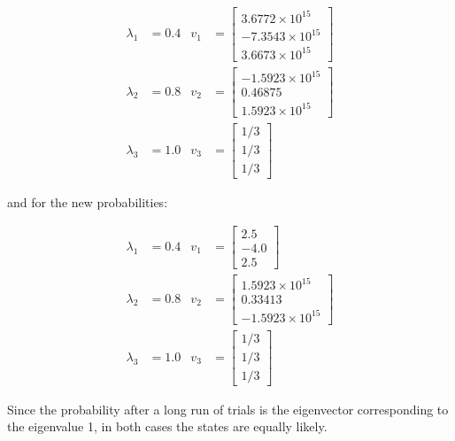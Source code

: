 \documentclass{article}
\begin{document}
\begin{align*}
\lambda_1 & = 0.4 & v_1 & = \left[ 
		\begin{matrix} 3.6772 \times 10^{15} \\ -7.3543 \times 10^{15} \\3.6673 \times 10^{15} 
	\end{matrix} \right] \\
\lambda_2 & = 0.8 & v_2 & = \left[
		\begin{matrix} -1.5923 \times 10^{15} \\ 0.46875 \\ 1.5923 \times 10^{15}
	\end{matrix} \right] \\
\lambda_3 & = 1.0 & v_3 & = \left[
		\begin{matrix} 1/3 \\ 1/3 \\ 1/3
	\end{matrix} \right]
\end{align*}

and for the new probabilities:

\begin{align*}
\lambda_1 & = 0.4 & v_1 & = \left[ 
		\begin{matrix} 2.5 \\ -4.0 \\ 2.5  
	\end{matrix} \right] \\
\lambda_2 & = 0.8 & v_2 & = \left[
		\begin{matrix} 1.5923 \times 10^{15} \\ 0.33413 \\ - 1.5923 \times 10^{15}
	\end{matrix} \right] \\
\lambda_3 & = 1.0 & v_3 & = \left[
		\begin{matrix} 1/3 \\ 1/3 \\ 1/3
	\end{matrix} \right]
\end{align*}

Since the probability after a long run of trials is the eigenvector corresponding
	to the eigenvalue 1, in both cases the states are equally likely. 
\end{document}
